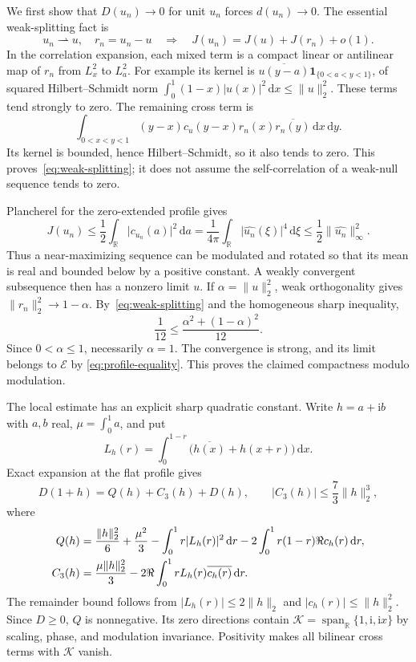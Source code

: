 \documentclass[11pt,reqno]{amsart}
\numberwithin{equation}{section}
\newcommand{\R}{\mathbb R}
\newcommand{\dd}{\,\mathrm d}
\newcommand{\ii}{\mathrm i}
\newcommand{\one}{\mathbf 1}
\newcommand{\norm}[1]{\lVert#1\rVert}
\newcommand{\abs}[1]{\lvert#1\rvert}
\begin{document}
We first show that $D(u_n)\to0$ for unit $u_n$ forces
$d(u_n)\to0$. The essential weak-splitting fact is
\begin{equation}\label{eq:weak-splitting}
 u_n\rightharpoonup u,\quad r_n=u_n-u
 \quad\Longrightarrow\quad J(u_n)=J(u)+J(r_n)+o(1).
\end{equation}
In the correlation expansion, each mixed term is a compact
linear or antilinear map of $r_n$ from $L^2_x$ to $L^2_a$.
For example its kernel is
$\overline{u(y-a)}\one_{\{0<a<y<1\}}$, of squared
Hilbert--Schmidt norm
$\int_0^1(1-x)\abs{u(x)}^2\dd x\le\norm u_2^2$.
These terms tend strongly to zero. The remaining cross term is
\[
 \int_{0<x<y<1}(y-x)c_u(y-x)
                         r_n(x)\overline{r_n(y)}\dd x\dd y.
\]
Its kernel is bounded, hence Hilbert--Schmidt, so it also tends
to zero. This proves~\eqref{eq:weak-splitting}; it does not
assume the self-correlation of a weak-null sequence tends to zero.

Plancherel for the zero-extended profile gives
\[
 J(u_n)\le\frac12\int_\R\abs{c_{u_n}(a)}^2\dd a
   =\frac1{4\pi}\int_\R\abs{\widehat{u_n}(\xi)}^4\dd\xi
   \le\frac12\norm{\widehat{u_n}}_\infty^2.
\]
Thus a near-maximizing sequence can be modulated and rotated so
that its mean is real and bounded below by a positive constant.
A weakly convergent subsequence then has a nonzero limit $u$.
If $\alpha=\norm u_2^2$, weak orthogonality gives
$\norm{r_n}_2^2\to1-\alpha$. By~\eqref{eq:weak-splitting}
and the homogeneous sharp inequality,
\[
 \frac1{12}\le\frac{\alpha^2+(1-\alpha)^2}{12}.
\]
Since $0<\alpha\le1$, necessarily $\alpha=1$. The convergence
is strong, and its limit belongs to $\mathcal E$ by
\eqref{eq:profile-equality}. This proves the claimed compactness
modulo modulation.

The local estimate has an explicit sharp quadratic constant.
Write $h=a+\ii b$ with $a,b$ real, $\mu=\int_0^1a$, and put
\[
 L_h(r)=\int_0^{1-r}\bigl(\overline{h(x)}+h(x+r)\bigr)\dd x.
\]
Exact expansion at the flat profile gives
\begin{equation}\label{eq:stability-expansion}
 D(1+h)=Q(h)+C_3(h)+D(h),\qquad
 \abs{C_3(h)}\le\frac73\norm h_2^3,
\end{equation}
where
\begin{align}\label{eq:Q-explicit}
 Q(h)&=\frac{\norm h_2^2}{6}+\frac{\mu^2}{3}
    -\int_0^1r\abs{L_h(r)}^2\dd r
    -2\int_0^1r(1-r)\Re c_h(r)\dd r,\notag\\
 C_3(h)&=\frac{\mu\norm h_2^2}{3}
    -2\Re\int_0^1rL_h(r)\overline{c_h(r)}\dd r.
\end{align}
The remainder bound follows from
$\abs{L_h(r)}\le2\norm h_2$ and
$\abs{c_h(r)}\le\norm h_2^2$.
Since $D\ge0$, $Q$ is nonnegative. Its zero directions contain
$\mathcal K=\operatorname{span}_{\R}\{1,\ii,\ii x\}$ by
scaling, phase, and modulation invariance. Positivity makes all
bilinear cross terms with $\mathcal K$ vanish.
\end{document}
